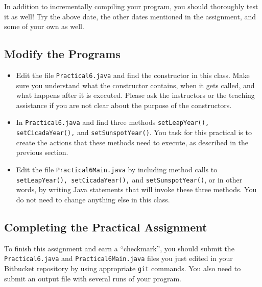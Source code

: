 \noindent In addition to incrementally compiling your program, you should thoroughly test it as well! Try the above
date, the other dates mentioned in the assignment, and some of your own as well.

\vspace*{-.1in}
\subsection*{Modify the Programs} 
\vspace*{-.05in}
\begin{itemize}
\item Edit the file {\tt Practical6.java} and find the constructor in this class. Make sure you understand what the constructor contains, when it gets called, and what happens after it is executed. Please ask the instructors or the teaching assistance if you are not clear about the purpose of the constructors. 
\item  In {\tt Practical6.java} and find three methods {\tt setLeapYear(), setCicadaYear(),} and {\tt  setSunspotYear()}. You task for this practical is to create the actions that these methods need to execute, as described in the previous section. 
\item Edit the file {\tt Practical6Main.java} by including method calls to {\tt setLeapYear(), setCicadaYear(),} and {\tt  setSunspotYear()}, or in other words, by writing Java statements that will invoke these three methods. You do not need to change anything else in this class.
\end{itemize}

\vspace*{-.25in}
\subsection*{Completing the Practical Assignment}
\vspace*{-.1in}
To finish this assignment and earn a ``checkmark'', you should 
submit the {\tt Practical6.java} and {\tt Practical6Main.java} files you just edited
in your Bitbucket repository by
using appropriate {\tt git} commands. You also need to submit an output file with several runs of your program.

\vspace*{-.15in}
